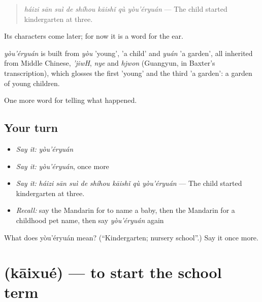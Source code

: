 \begin{quote}
\emph{háizi sān suì de shíhou kāishǐ qù yòu'éryuán} — The child started kindergarten at three.
\end{quote}

Its characters come later; for now it is a word for the ear.

\begin{cousinweb}
\emph{yòu'éryuán} is built from \emph{yòu} 'young',  'a child' and \emph{yuán} 'a garden', all inherited from Middle Chinese, \emph{'jiwH}, \emph{nye} and \emph{hjwon} (Guangyun, in Baxter's transcription), which glosses the first 'young' and the third 'a garden': a garden of young children.
\end{cousinweb}

\begin{grammarlens}[title={What you've built}]
One more word for telling what happened.
\end{grammarlens}

\subsection*{Your turn}
\begin{itemize}
\raggedright
  \item \emph{Say it:} \emph{yòu'éryuán}
  \item \emph{Say it:} \emph{yòu'éryuán}, once more
  \item \emph{Say it:} \emph{háizi sān suì de shíhou kāishǐ qù yòu'éryuán} — The child started kindergarten at three.
  \item \emph{Recall:} say the Mandarin for to name a baby, then the Mandarin for a childhood pet name, then say \emph{yòu'éryuán} again
\end{itemize}

\begin{tcolorbox}[breakable,colback=teal!4,colframe=teal!35!black,title={Before you move on}]
What does yòu'éryuán mean? (\textquotedblleft{}Kindergarten; nursery school\textquotedblright{}.) Say it once more.
\end{tcolorbox}
\section[\texorpdfstring{\zh{开学} (kāixué)}{开学 (kāixué)}]{ (kāixué) — to start the school term}

\label{lesson:ZH-C303-kaixue}



